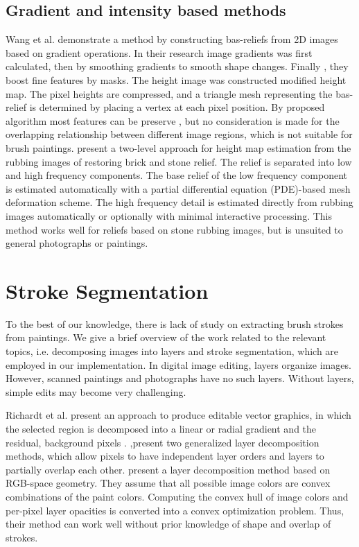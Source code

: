 \subsection{Gradient and intensity based methods}
Wang et al.\cite{wang2010image} demonstrate a method by constructing bas-reliefs from 2D images based on gradient operations. In their research image gradients was first calculated, then by smoothing gradients to smooth shape changes. Finally , they boost fine features by masks.
The height image was constructed modified height map. The pixel heights are compressed, and a triangle mesh representing the bas-relief is determined by placing a vertex at each pixel position. By proposed  algorithm most features can be preserve , but no consideration is made for the overlapping relationship between different image regions, which is not suitable for brush paintings. \newline
\cite{li2012restoration} present a two-level approach for height map estimation from the rubbing images of restoring brick and stone relief.  The relief is separated into low and high frequency components. The base relief of the low frequency component is estimated automatically with a partial differential equation (PDE)-based mesh deformation scheme. The high frequency detail is estimated directly from rubbing images automatically or optionally with minimal interactive processing. This method works well for reliefs based on stone rubbing images, but is unsuited to general photographs or paintings.

\section{Stroke Segmentation}

To the best of our knowledge, there is lack of study on extracting brush strokes from paintings. We give a brief overview of the work related to the relevant topics, i.e. decomposing images into layers and stroke segmentation, which are employed in our implementation. In digital image editing, layers organize images. However, scanned paintings and photographs have no such layers. Without layers, simple edits may become very challenging.

Richardt et al.\cite{richardt2014vectorising} present an approach to produce editable vector graphics, in which the selected region is decomposed into a linear or radial gradient and the residual, background pixels . \cite{mccann2009local},\cite{mccann2012soft}present two generalized layer decomposition methods, which allow pixels to have independent layer orders and layers to partially overlap each other.\cite{tan2016decomposing} present a layer decomposition method based on RGB-space geometry. They assume that all possible image colors are convex combinations of the paint colors. Computing the convex hull of image colors and per-pixel layer opacities is converted into a convex optimization problem. Thus, their method can work well without prior knowledge of shape and overlap of strokes.

